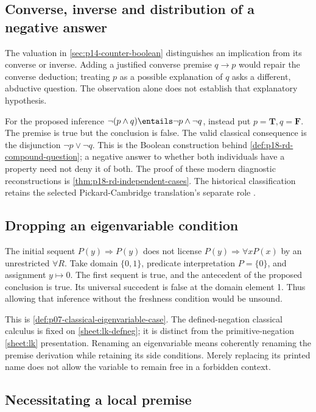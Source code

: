 \subsection{Converse, inverse and distribution of a negative answer}

The valuation in \cref{sec:p14-counter-boolean} distinguishes an implication
from its converse or inverse. Adding a justified converse premise
\(q\to p\) would repair the converse deduction; treating \(p\) as a
possible explanation of \(q\) asks a different, abductive question.
The observation alone does not establish that explanatory hypothesis.

For the proposed inference
\(\neg(p\land q)\entails\neg p\land\neg q\), instead put
\(p=\mathbf T,q=\mathbf F\). The premise is true but the conclusion
is false. The valid classical consequence is the disjunction
\(\neg p\lor\neg q\). This is the Boolean construction behind
\cref{def:p18-rd-compound-question}; a negative answer to whether both
individuals have a property need not deny it of both. The proof of these
modern diagnostic reconstructions is
\cref{thm:p18-rd-independent-cases}. The historical classification retains
the selected Pickard-Cambridge translation's separate role
\cite{AristotleSophisticalRefutationsPickardCambridgeMIT}.

\subsection{Dropping an eigenvariable condition}
\label{sec:p14-counter-eigenvariable}

The initial sequent \(P(y)\Rightarrow P(y)\) does not license
\(P(y)\Rightarrow\forall xP(x)\) by an unrestricted \(\forall R\).
Take domain \(\{0,1\}\), predicate interpretation \(P=\{0\}\), and
assignment \(y\mapsto0\). The first sequent is true, and the antecedent
of the proposed conclusion is true. Its universal succedent is false at
the domain element 1. Thus allowing that inference without the freshness
condition would be unsound.

This is \cref{def:p07-classical-eigenvariable-case}. The defined-negation
classical calculus is fixed on \cref{sheet:lk-defneg}; it is distinct from
the primitive-negation \cref{sheet:lk} presentation. Renaming an
eigenvariable means coherently renaming the premise derivation while retaining
its side conditions. Merely replacing its printed name does not allow the
variable to remain free in a forbidden context.

\subsection{Necessitating a local premise}
\label{sec:p14-counter-local-necessitation}

